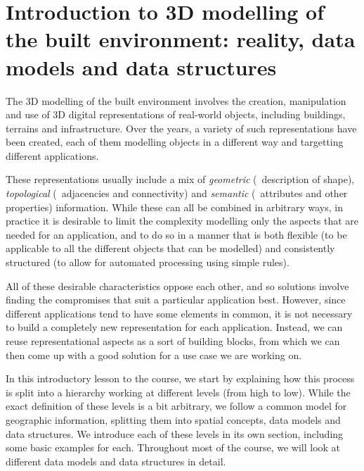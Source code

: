 
\setchapterpreamble[u]{\margintoc}

\graphicspath{{dmds/}}
\renewcommand*{\thelesson}{1.1}

\chapter{Introduction to 3D modelling of the built environment: reality, data models and data structures}%
\label{chap:dmds}


The 3D modelling of the built environment involves the creation, manipulation and use of 3D digital representations of real-world objects, including buildings, terrains and infrastructure.
Over the years, a variety of such representations have been created, each of them modelling objects in a different way and targetting different applications.


These representations usually include a mix of \emph{geometric} (\ie\ description of shape), \emph{topological} (\ie\ adjacencies and connectivity) and \emph{semantic} (\ie\ attributes and other properties) information.
While these can all be combined in arbitrary ways, in practice it is desirable to limit the complexity modelling only the aspects that are needed for an application, and to do so in a manner that is both flexible (to be applicable to all the different objects that can be modelled) and consistently structured (to allow for automated processing using simple rules).


All of these desirable characteristics oppose each other, and so solutions involve finding the compromises that suit a particular application best.
However, since different applications tend to have some elements in common, it is not necessary to build a completely new representation for each application.
Instead, we can reuse representational aspects as a sort of building blocks, from which we can then come up with a good solution for a use case we are working on.


In this introductory lesson to the course, we start by explaining how this process is split into a hierarchy working at different levels (from high to low).
While the exact definition of these levels is a bit arbitrary, we follow a common model for geographic information, splitting them into spatial concepts, data models and data structures.
We introduce each of these levels in its own section, including some basic examples for each.
Throughout most of the course, we will look at different data models and data structures in detail.

